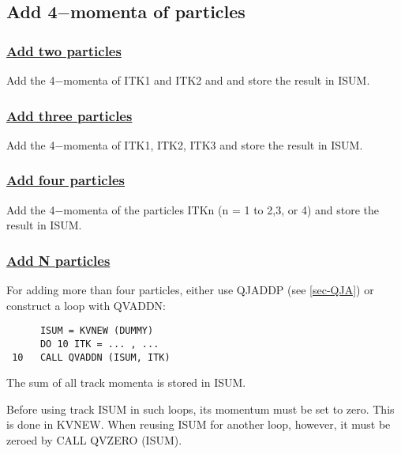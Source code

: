 \subsection{\label{sec-QVA}Add 4$-$momenta of particles}
\par
\subsubsection{\underline{Add two particles}}
\par
{}
\par
Add the 4$-$momenta of ITK1 and ITK2 and and store
the result in ISUM.
\par
\subsubsection{\underline{Add three particles}}
\par
{}
\par
Add the 4$-$momenta of ITK1, ITK2, ITK3 and store
the result in ISUM.
\par
\subsubsection{\underline{Add four particles}}
\par
{}
\par
Add the 4$-$momenta of the particles ITKn (n = 1 to 2,3, or 4) and
store
the result in ISUM.
\par
\subsubsection{\underline{Add N particles}}
\par
{}
\par
\par
For adding more than four particles, either use QJADDP (see
\ref{sec-QJA}) or
construct a loop with QVADDN:
\begin{verbatim}
      ISUM = KVNEW (DUMMY)
      DO 10 ITK = ... , ...
 10   CALL QVADDN (ISUM, ITK)
\end{verbatim}
The sum of all track momenta is stored in ISUM.
 
Before using track ISUM in such loops, its momentum must be set
to zero. This is done in KVNEW. When reusing ISUM for another
loop, however, it must be zeroed by CALL QVZERO (ISUM).
\par
